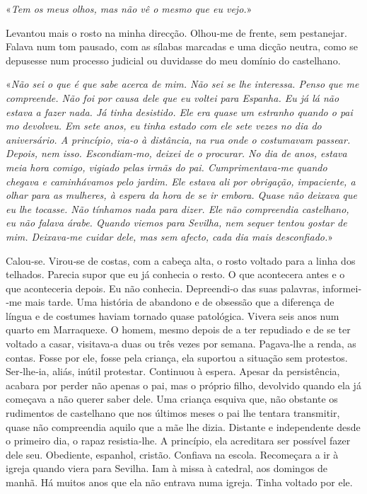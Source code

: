 «\emph{Tem os meus olhos, mas não vê o mesmo que eu vejo.}»

Levantou mais o rosto na minha direcção. Olhou­‑me de frente, sem
pestanejar. Falava num tom pausado, com as sílabas marcadas e uma dicção
neutra, como se depusesse num processo judicial ou duvidasse do meu
domínio do castelhano.

«\emph{Não sei o que é que sabe acerca de mim. Não sei se lhe interessa.
Penso que me compreende. Não foi por causa dele que eu voltei para
Espanha. Eu já lá não estava a fazer nada. Já tinha desistido. Ele era
quase um estranho quando o pai mo devolveu. Em sete anos, eu tinha
estado com ele sete vezes no dia do aniversário. A princípio, via­‑o à
distância, na rua onde o costumavam passear. Depois, nem isso.
Escondiam­‑mo, deixei de o procurar. No dia de anos, estava meia hora
comigo, vigiado pelas irmãs do pai. Cumprimentava­‑me quando chegava e
caminhávamos pelo jardim. Ele estava ali por obrigação, impaciente, a
olhar para as mulheres, à espera da hora de se ir embora. Quase não
deixava que eu lhe tocasse. Não tínhamos nada para dizer. Ele não
compreendia castelhano, eu não falava árabe. Quando viemos para Sevilha,
nem sequer tentou gostar de mim. Deixava­‑me cuidar dele, mas sem
afecto, cada dia mais desconfiado.}»

Calou­‑se. Virou­‑se de costas, com a cabeça alta, o rosto voltado para
a linha dos telhados. Parecia supor que eu já conhecia o resto. O que
acontecera antes e o que aconteceria depois. Eu não conhecia.
Depreendi­‑o das suas palavras, informei­‑me mais tarde. Uma história de
abandono e de obsessão que a diferença de língua e de costumes haviam
tornado quase patológica. Vivera seis anos num quarto em Marraquexe. O
homem, mesmo depois de a ter repudiado e de se ter voltado a casar,
visitava­‑a duas ou três vezes por semana. Pagava­‑lhe a renda, as
contas. Fosse por ele, fosse pela criança, ela suportou a situação sem
protestos. Ser­‑lhe­‑ia, aliás, inútil protestar. Continuou à espera.
Apesar da persistência, acabara por perder não apenas o pai, mas o
próprio filho, devolvido quando ela já começava a não querer saber dele.
Uma criança esquiva que, não obstante os rudimentos de castelhano que
nos últimos meses o pai lhe tentara transmitir, quase não compreendia
aquilo que a mãe lhe dizia. Distante e independente desde o primeiro
dia, o rapaz resistia­‑lhe. A princípio, ela acreditara ser possível
fazer dele seu. Obediente, espanhol, cristão. Confiava na escola.
Recomeçara a ir à igreja quando viera para Sevilha. Iam à missa à
catedral, aos domingos de manhã. Há muitos anos que ela não entrava numa
igreja. Tinha voltado por ele.

